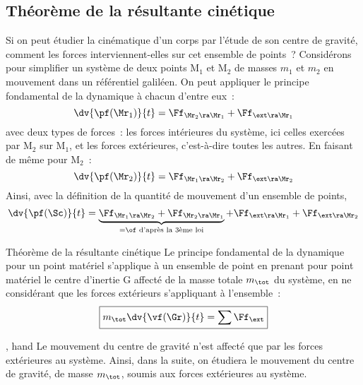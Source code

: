 \documentclass[../main/main.tex]{subfiles}
\begin{document}
\subsection{Théorème de la résultante cinétique}
Si on peut étudier la cinématique d'un corps par l'étude de son centre de
gravité, comment les forces interviennent-elles sur cet ensemble de points~?
Considérons pour simplifier un système de deux points M$_1$ et M$_2$ de masses
$m_1$ et $m_2$ en mouvement dans un référentiel galiléen. On peut appliquer le
principe fondamental de la dynamique à chacun d'entre eux~:
\[\dv{\pf(\Mr_1)}{t} = \Ff_{\Mr_2\ra\Mr_1} + \Ff_{\ext\ra\Mr_1}\]
avec deux types de forces~: les forces intérieures du système, ici celles
exercées par M$_2$ sur M$_1$, et les forces extérieures, c'est-à-dire toutes les
autres. En faisant de même pour M$_2$~:
\[\dv{\pf(\Mr_2)}{t} = \Ff_{\Mr_1\ra\Mr_2} + \Ff_{\ext\ra\Mr_2}\]
Ainsi, avec la définition de la quantité de mouvement d'un ensemble de points,
\[\dv{\pf(\Sc)}{t} = \underbrace{\Ff_{\Mr_1\ra\Mr_2}+\Ff_{\Mr_2\ra\Mr_1}}_{= \of
\text{ d'après la 3ème loi}} + \Ff_{\ext\ra\Mr_1} + \Ff_{\ext\ra\Mr_2}\]
\begin{tprop}{Théorème de la résultante cinétique}
    Le principe fondamental de la dynamique pour un point matériel s'applique à
    un ensemble de point en prenant pour point matériel le centre d'inertie G
    affecté de la masse totale $m_{\tot}$ du système, en ne considérant que les forces
    extérieurs s'appliquant à l'ensemble~:
    \[\boxed{m_{\tot}\dv{\vf(\Gr)}{t} = \sum \Ff_{\ext}}\]
\end{tprop}

\begin{tror}{, hand}
    Le mouvement du centre de gravité n’est affecté que par les forces
    extérieures au système. Ainsi, dans la suite, on étudiera le mouvement du
    centre de gravité, de masse $m_{\tot}$, soumis aux forces extérieures au
    système.
\end{tror}
\end{document}
